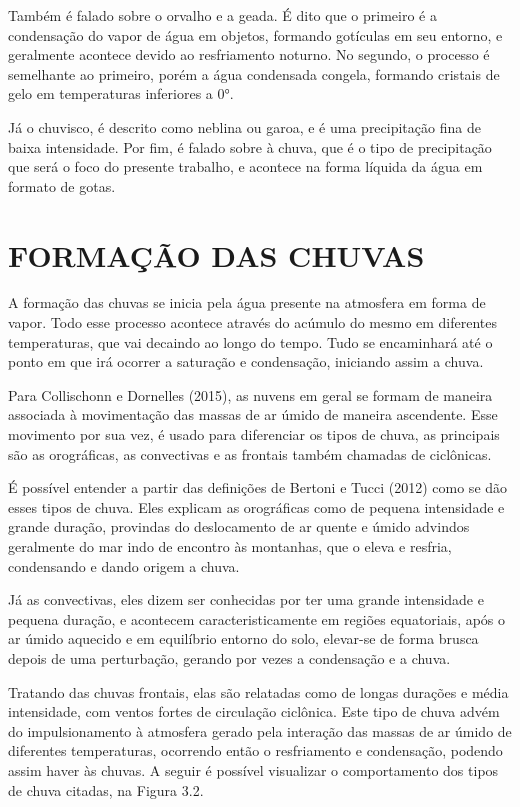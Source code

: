 Também é falado sobre o orvalho e a geada. É dito que o primeiro é a condensação do vapor de água em objetos, formando gotículas em seu entorno, e geralmente acontece devido ao resfriamento noturno. No segundo, o processo é semelhante ao primeiro, porém a água condensada congela, formando cristais de gelo em temperaturas inferiores a 0°. 

Já o chuvisco, é descrito como neblina ou garoa, e é uma precipitação fina de baixa intensidade. Por fim, é falado sobre à chuva, que é o tipo de precipitação que será o foco do presente trabalho, e acontece na forma líquida da água em formato de gotas. 

\section{FORMAÇÃO DAS CHUVAS}

A formação das chuvas se inicia pela água presente na atmosfera em forma de vapor. Todo esse processo acontece através do acúmulo do mesmo em diferentes temperaturas, que vai decaindo ao longo do tempo. Tudo se encaminhará até o ponto em que irá ocorrer a saturação e condensação, iniciando assim a chuva. 

Para Collischonn e Dornelles (2015), as nuvens em geral se formam de maneira associada à movimentação das massas de ar úmido de maneira ascendente. Esse movimento por sua vez, é usado para diferenciar os tipos de chuva, as principais são as orográficas, as convectivas e as frontais também chamadas de ciclônicas.

É possível entender a partir das definições de Bertoni e Tucci (2012) como se dão esses tipos de chuva. Eles explicam as orográficas como de pequena intensidade e grande duração, provindas do deslocamento de ar quente e úmido advindos geralmente do mar indo de encontro às montanhas, que o eleva e resfria, condensando e dando origem a chuva. 

Já as convectivas, eles dizem ser conhecidas por ter uma grande intensidade e pequena duração, e acontecem caracteristicamente em regiões equatoriais, após o ar úmido aquecido e em equilíbrio entorno do solo, elevar-se de forma brusca depois de uma perturbação, gerando por vezes a condensação e a chuva. 

Tratando das chuvas frontais, elas são relatadas como de longas durações e média intensidade, com ventos fortes de circulação ciclônica. Este tipo de chuva advém do impulsionamento à atmosfera gerado pela interação das massas de ar úmido de diferentes temperaturas, ocorrendo então o resfriamento e condensação, podendo assim haver às chuvas. A seguir é possível visualizar o comportamento dos tipos de chuva citadas, na Figura 3.2.\bigskip

